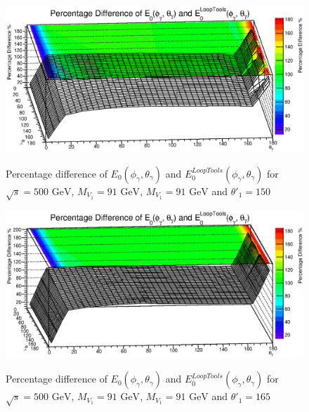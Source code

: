 \begin{figure}
	\begin{center}
		\includegraphics[scale=0.55]{150PD3.eps}\\
		\caption{ Percentage difference of $E_0(\phi_\gamma,\theta_\gamma)$ and $E_0^{LoopTools}(\phi_\gamma,\theta_\gamma)$ for $\sqrt{s}=500\text{ GeV}$, $M_{V_1}=91\text{ GeV}$, $M_{V_1}=91\text{ GeV}$ and $\theta'_1=150$ }
	\end{center}
\end{figure}

\begin{figure}
	\begin{center}
		\includegraphics[scale=0.55]{165PD3.eps}\\
		\caption{ Percentage difference of $E_0(\phi_\gamma,\theta_\gamma)$ and $E_0^{LoopTools}(\phi_\gamma,\theta_\gamma)$ for $\sqrt{s}=500\text{ GeV}$, $M_{V_1}=91\text{ GeV}$, $M_{V_1}=91\text{ GeV}$ and $\theta'_1=165$ }
	\end{center}
\end{figure}


